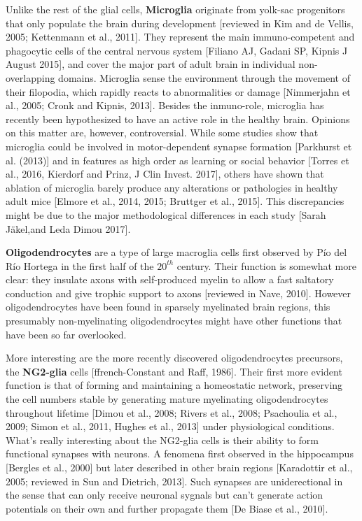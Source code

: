 Unlike the rest of the glial cells, \textbf{Microglia} originate from yolk-sac progenitors that only populate the brain during development [reviewed in Kim and de Vellis, 2005; Kettenmann et al., 2011].
They represent the main immuno-competent and phagocytic cells of the central nervous system [Filiano AJ, Gadani SP, Kipnis J August 2015], and cover the major part of adult brain in individual non-overlapping domains.
Microglia sense the environment through the movement of their filopodia, which rapidly reacts to abnormalities or damage [Nimmerjahn et al., 2005; Cronk and Kipnis, 2013].
Besides the inmuno-role, microglia has recently been hypothesized to have an active role in the healthy brain. 
Opinions on this matter are, however, controversial. 
While some studies show that microglia could be involved in motor-dependent synapse formation [Parkhurst et al. (2013)] and in features as high order as learning or social behavior [Torres et al., 2016, Kierdorf and Prinz, J Clin Invest. 2017], others have shown that ablation of microglia barely produce any alterations or pathologies in healthy adult mice [Elmore et al., 2014, 2015; Bruttger et al., 2015].
This discrepancies might be due to the major methodological differences in each study [Sarah Jäkel,and Leda Dimou 2017].

\textbf{Oligodendrocytes} are a type of large macroglia cells first observed by Pío del Río Hortega in the first half of the $20^{th}$ century.  
Their function is somewhat more clear: they insulate axons with self-produced myelin to allow a fast saltatory conduction and give trophic support to axons [reviewed in Nave, 2010].
However oligodendrocytes have been found in sparsely myelinated brain regions, this presumably non-myelinating oligodendrocytes might have other functions that have been so far overlooked.

More interesting are the more recently discovered oligodendrocytes precursors, the \textbf{NG2-glia} cells [ffrench-Constant and Raff, 1986].
Their first more evident function is that of forming and maintaining a homeostatic network, preserving the cell numbers stable by generating mature myelinating oligodendrocytes throughout lifetime [Dimou et al., 2008; Rivers et al., 2008; Psachoulia et al., 2009; Simon et al., 2011, Hughes et al., 2013] under physiological conditions.
What's really interesting about the NG2-glia cells is their ability to form functional synapses with neurons.
A fenomena first observed in the hippocampus [Bergles et al., 2000] but later described in other brain regions [Karadottir et al., 2005; reviewed in Sun and Dietrich, 2013].
Such synapses are uniderectional in the sense that can only receive neuronal sygnals but can't generate action potentials on their own and further propagate them [De Biase et al., 2010].

